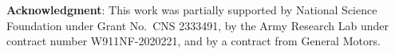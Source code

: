 \begin{comment}
To adapt to a new task, PAVE only needs to issue a small patch (\eg 20 MB) with the LoRA weights on top of the vanilla video-LLM, which needs around 16 GB to store its parameters. It adds negligible parameters and operations with minimal computational cost while preserving the base model architecture and pre-trained weights. 

we present PAVE, a flexible framework for adapting pre-trained Video LLMs to downstream tasks with side-channel signals, such as audio, 3D cues, or multi-view videos.
PAVE introduces lightweight adapters, referred to as ``patches,'' which adds a small number of parameters and operations to a base model without modifying its architecture or pre-trained weights. In doing so, PAVE can effectively adapt the pre-trained base model to support diverse downstream tasks, including audio-visual question answering, 3D reasoning, multi-view video recognition, and high frame rate video understanding. Across these tasks, PAVE significant enhances the performance of the base model, surpassing state-of-the-art task-specific models while incurring a minor cost of $\sim$0.1\% additional FLOPs and parameters. Further, PAVE supports multi-task learning and generalizes well across different Video LLMs.

PAVE effectively adapts video-LLMs for tasks such as audio-visual understanding, 3D reasoning, and multi-view video understanding, surpassing state-of-the-art task-specific models. 

that feature temporal supplementary signals alongside videos. 
Targeting this setting, we introduced PAVE, a framework that leverages a patching mechanism to adapt existing video-LLMs with additional side-channel information. To adapt to a new task, PAVE only needs to issue a small patch (\eg 20 MB) with the LoRA weights on top of the vanilla video-LLM, which needs around 16 GB to store its parameters. It adds negligible parameters and operations with minimal computational cost while preserving the base model architecture and pre-trained weights. 
PAVE effectively adapts video-LLMs for tasks such as audio-visual understanding, 3D reasoning, and multi-view video understanding, surpassing state-of-the-art task-specific models. 
Additionally, PAVE can enhance video understanding by integrating high-frame-rate videos. 
We hope our work sheds light on adapting MLLMs for diverse tasks and unifying multi-modal information to support complex reasoning.
\end{comment}

\medskip
\noindent \textbf{Acknowledgment}: This work was partially supported by National Science Foundation under Grant No.\ CNS 2333491, by the Army Research Lab under contract number W911NF-2020221, and by a contract from General Motors. 